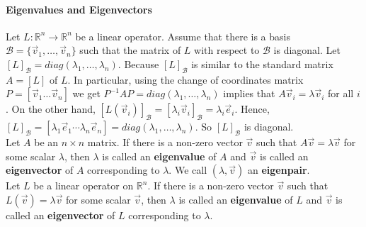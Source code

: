 \documentclass[10pt,letter]{article}
\begin{document}
\paragraph{Eigenvalues and Eigenvectors} Let $L:\mathbb{R}^n\rightarrow\mathbb{R}^n$ be a linear operator. Assume that there is a basis $\mathcal{B}=\{\vec{v}_1,\ldots,\vec{v}_n\}$ such that the matrix of $L$ with respect to $\mathcal{B}$ is diagonal. Let $[L]_\mathcal{B}=diag(\lambda_1,\ldots,\lambda_n)$. Because $[L]_\mathcal{B}$ is similar to the standard matrix $A=[L]$ of $L$. In particular, using the change of coordinates matrix $P=[\vec{v}_1\ldots\vec{v}_n]$ we get $P^{-1}AP=diag(\lambda_1,\ldots,\lambda_n)$ implies that $A\vec{v}_i=\lambda\vec{v}_i$ for all $i$. On the other hand, $[L(\vec{v}_i)]_\mathcal{B}=[\lambda_i\vec{v}_i]_\mathcal{B}=\lambda_i\vec{e}_i$. Hence, $[L]_\mathcal{B}=[\lambda_1\vec{e}_1\cdots\lambda_n\vec{e}_n]=diag(\lambda_1,\ldots,\lambda_n)$. So $[L]_\mathcal{B}$ is diagonal. \\ 
Let $A$ be an $n\times n$ matrix. If there is a non-zero vector $\vec{v}$ such that $A\vec{v}=\lambda\vec{v}$ for some scalar $\lambda$, then $\lambda$ is called an \textbf{eigenvalue} of $A$ and $\vec{v}$ is called an \textbf{eigenvector} of $A$ corresponding to $\lambda$. We call $(\lambda,\vec{v})$ an \textbf{eigenpair}. \\ 
Let $L$ be a linear operator on $\mathbb{R}^n$. If there is a non-zero vector $\vec{v}$ such that $L(\vec{v})=\lambda\vec{v}$ for some scalar $\vec{v}$, then $\lambda$ is called an \textbf{eigenvalue} of $L$ and $\vec{v}$ is called an \textbf{eigenvector} of $L$ corresponding to $\lambda$. \\ 
\end{document}
